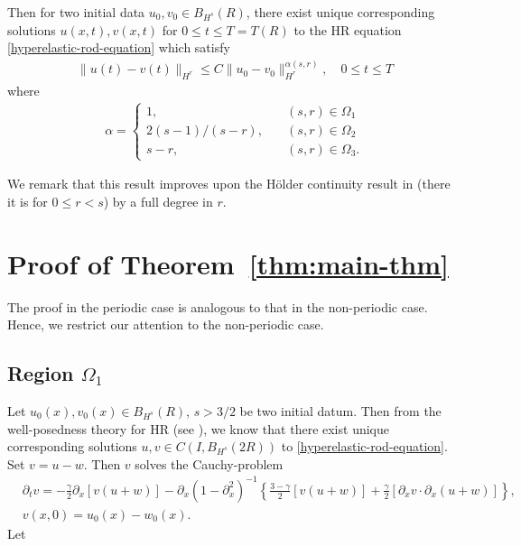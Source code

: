 \documentclass[12pt,reqno]{amsart}
\numberwithin{equation}{section}  %
\numberwithin{figure}{section}
\newcommand{\p}{\partial}
\begin{document}
%
%
Then for two initial data $u_{0}, v_{0} \in B_{H^{s}}(R)$, there exist unique
corresponding solutions $u(x,t), v(x,t)$ for $0 \le t \le T= T(R)$ to the
HR equation \eqref{hyperelastic-rod-equation} which satisfy 
%
%
\begin{equation*}
\begin{split}
  \| u(t) - v(t) \|_{H^{r}} \le C \| u_{0} - v_{0} \|_{H^{r}}^{\alpha(s, r)},
  \quad 0
  \le t \le T
\end{split}
\end{equation*}
%
%
where 
%
%
\begin{equation*}
\begin{split}
\alpha = 
\begin{cases}
   1, \quad & (s,r) \in \Omega_{1} 
  \\
   2(s-1)/(s-r),  \quad & (s, r) \in \Omega_{2}
  \\
   s-r, \quad & (s, r) \in \Omega_{3}.
\end{cases}
\end{split}
\end{equation*}
%

%
%
%
%
%
%
%
We remark that this result improves upon the H\"older continuity result in
\cite{Chen:2011fk} (there it is for $0 \le r < s$) by a full degree in $r$. 
%
%
%
%
\section{Proof of Theorem~\ref{thm:main-thm}}
%
%
The proof in the periodic case is analogous to that in the non-periodic case.
Hence, we restrict our attention to the non-periodic case. 
%
%
%
\subsection{Region $\Omega_{1}$} 
\label{ssec:reg-m-imp}
%
%
Let $u_{0}(x), v_{0}(x)
\in B_{H^{s}}(R)$, $s > 3/2$ be two initial datum. Then from
the well-posedness theory for HR (see \cite{Karapetyan:2010fk}), we
know that there exist unique corresponding solutions $u, v \in C(I,
B_{H^{s}}(2R))$ to \eqref{hyperelastic-rod-equation}.
Set $v=u-w$. Then $v$ solves the Cauchy-problem
%
%
\begin{align}
	\label{uniqueness-exp}
& \p_t v
=  -\frac{\gamma}{2} \p_x [v(u + w)] 
-\p_x (1 - \p_{x}^{2})^{-1} \left\{
\frac{3-\gamma}{2}[v(u+w)] + \frac{\gamma}{2}[\p_x v \cdot \p_x (u+w)]
\right\},
\\
& v(x,0) = u_{0}(x) - w_{0}(x).
\label{uniqueness-init-data}
\end{align}
%
%
%
Let
\end{document}
